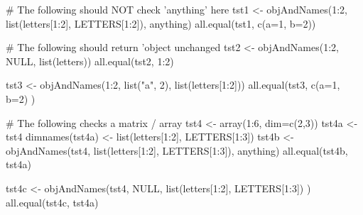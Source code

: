 \begin{Examples}
\begin{ExampleCode}
# The following should NOT check 'anything' here
tst1 <- objAndNames(1:2, list(letters[1:2], LETTERS[1:2]), anything)
all.equal(tst1, c(a=1, b=2))

# The following should return 'object unchanged
tst2 <- objAndNames(1:2, NULL, list(letters))
all.equal(tst2, 1:2)

tst3 <- objAndNames(1:2, list("a", 2), list(letters[1:2]))
all.equal(tst3, c(a=1, b=2) )

# The following checks a matrix / array
tst4 <- array(1:6, dim=c(2,3))
tst4a <- tst4
dimnames(tst4a) <- list(letters[1:2], LETTERS[1:3])
tst4b <- objAndNames(tst4, 
       list(letters[1:2], LETTERS[1:3]), anything)
all.equal(tst4b, tst4a)

tst4c <- objAndNames(tst4, NULL,        
       list(letters[1:2], LETTERS[1:3]) )
all.equal(tst4c, tst4a)

\end{ExampleCode}
\end{Examples}

